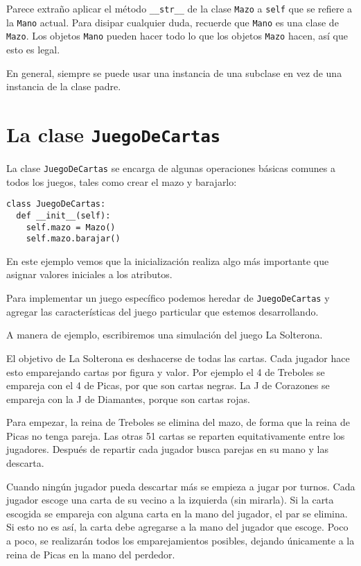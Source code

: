 Parece extraño aplicar el método {\tt\_\_str\_\_} de la clase \texttt{Mazo} 
a \texttt{self} que se refiere a la  {\tt Mano} actual. Para 
disipar cualquier duda, recuerde que  \texttt{Mano} es una clase de 
\texttt{Mazo}.  Los objetos \texttt{Mano} pueden hacer todo lo que 
los objetos \texttt{Mazo} hacen, así que esto es legal.


En general, siempre se puede usar una instancia de una subclase 
en vez de una instancia de la clase padre.


\section {La clase \texttt{JuegoDeCartas}}

La clase \texttt{JuegoDeCartas} se encarga de algunas operaciones
básicas comunes a todos los juegos, tales como crear el mazo y 
barajarlo:

\beforeverb
\begin{verbatim}
class JuegoDeCartas:
  def __init__(self):
    self.mazo = Mazo()
    self.mazo.barajar()
\end{verbatim}
\afterverb
%
En este ejemplo vemos que la inicialización realiza algo más 
importante que asignar valores iniciales a los atributos.

Para implementar un juego específico podemos heredar de 
\texttt{JuegoDeCartas} y agregar las características del juego
particular que estemos desarrollando.

A manera de ejemplo, escribiremos una simulación del juego 
La Solterona.

El objetivo de La Solterona es deshacerse de todas las cartas. 
Cada jugador hace esto emparejando cartas por figura y valor. 
Por ejemplo el 4 de Treboles se empareja con el  4 de Picas, 
por que son cartas negras.  La J de Corazones se empareja con 
la J de  Diamantes, porque son cartas rojas.

Para empezar, la reina de Treboles se elimina del mazo, de forma
que la reina de Picas no tenga pareja.  Las otras 51 cartas se 
reparten equitativamente entre los jugadores. Después de repartir
cada jugador busca parejas en su mano y las descarta. 

Cuando ningún jugador pueda descartar más se empieza a jugar por turnos.
Cada jugador escoge una carta de su vecino a la izquierda (sin mirarla). 
Si la carta escogida se empareja con alguna carta en la mano del jugador,
el par se elimina. Si esto no es así, la carta debe agregarse a la mano 
del jugador que escoge. Poco a poco, se realizarán todos los emparejamientos
posibles, dejando únicamente a la reina de Picas en la mano del perdedor.

